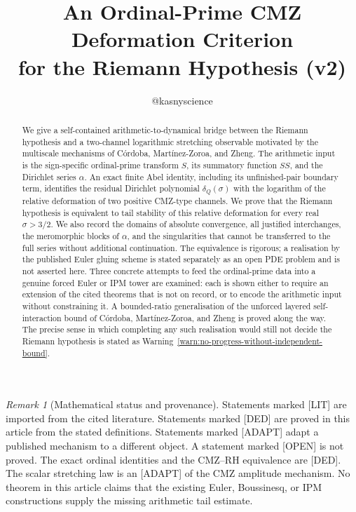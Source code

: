 \documentclass[11pt]{amsart}
\title{An Ordinal-Prime CMZ Deformation Criterion\\
for the Riemann Hypothesis (v2)}
\author{@kasnyscience}
\date{}
\numberwithin{equation}{section}
\theoremstyle{plain}
\theoremstyle{definition}
\theoremstyle{remark}
\newtheorem{remark}[theorem]{Remark}
\begin{document}
\begin{abstract}
We give a self-contained arithmetic-to-dynamical bridge between the Riemann
hypothesis and a two-channel logarithmic stretching observable motivated by
the multiscale mechanisms of C\'ordoba, Mart\'inez-Zoroa, and Zheng.  The
arithmetic input is the sign-specific ordinal-prime transform $S$, its
summatory function $SS$, and the Dirichlet series $\alpha$.  An exact finite
Abel identity, including its unfinished-pair boundary term, identifies the
residual Dirichlet polynomial $\delta_Q(\sigma)$ with the logarithm of the
relative deformation of two positive CMZ-type channels.  We prove that the
Riemann hypothesis is equivalent to tail stability of this relative
deformation for every real $\sigma>3/2$.  We also record the domains of
absolute convergence, all justified interchanges, the meromorphic blocks of
$\alpha$, and the singularities that cannot be transferred to the full
series without additional continuation.  The equivalence is rigorous; a
realisation by the published Euler gluing scheme is stated separately as an
open PDE problem and is not asserted here.  Three concrete attempts to feed
the ordinal-prime data into a genuine forced Euler or IPM tower are examined:
each is shown either to require an extension of the cited theorems that is
not on record, or to encode the arithmetic input without constraining it.  A
bounded-ratio generalisation of the unforced layered self-interaction bound
of C\'ordoba, Mart\'inez-Zoroa, and Zheng is proved along the way.  The
precise sense in which completing any such realisation would still not
decide the Riemann hypothesis is stated as
Warning~\ref{warn:no-progress-without-independent-bound}.
\end{abstract}

\maketitle

\tableofcontents

\bigskip

\begin{remark}[Mathematical status and provenance]
\label{rem:status}
Statements marked \textup{[LIT]} are imported from the cited literature.
Statements marked \textup{[DED]} are proved in this article from the stated
definitions.  Statements marked \textup{[ADAPT]} adapt a published mechanism
to a different object.  A statement marked \textup{[OPEN]} is not proved.
The exact ordinal identities and the CMZ--RH equivalence are \textup{[DED]}.
The scalar stretching law is an \textup{[ADAPT]} of the CMZ amplitude
mechanism.  No theorem in this article claims that the existing Euler,
Boussinesq, or IPM constructions supply the missing arithmetic tail estimate.
\end{remark}
\end{document}
